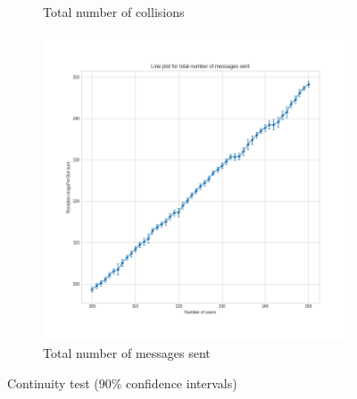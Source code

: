 \begin{figure}[p]
\begin{subfigure}[b]{0.45\textwidth}
		\caption{Total number of
		collisions}\label{subfig:continuity-collisions}
	\end{subfigure}
	\begin{subfigure}[b]{0.35\textheight}
		\centering
		\includegraphics[width=\textwidth]{img/continuity-msgssent}
		\caption{Total number of messages
		sent}\label{subfig:continuity-messages}
	\end{subfigure}
	\caption{Continuity test (\(90\%\) confidence
	intervals)}\label{fig:continuity}
\end{figure}
\clearpage
{}
